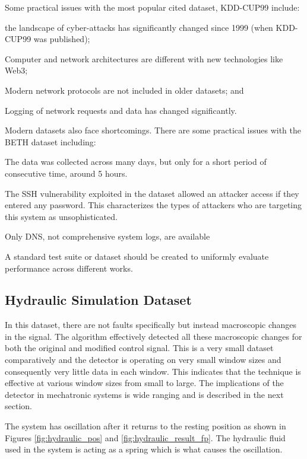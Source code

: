 Some practical issues with the most popular cited dataset, KDD-CUP99 include:
\begin{inlinelist}
    \item the landscape of cyber-attacks has significantly changed since 1999 (when KDD-CUP99 was published);
    \item Computer and network architectures are different with new technologies like Web3;
    \item Modern network protocols are not included in older datasets; and
    \item Logging of network requests and data has changed significantly.
\end{inlinelist}

Modern datasets also face shortcomings. There are some practical issues with the BETH dataset including:
\begin{inlinelist}
    \item The data was collected across many days, but only for a short period of consecutive time, around 5 hours.
    \item The SSH vulnerability exploited in the dataset allowed an attacker access if they entered any password. This characterizes the types of attackers who are targeting this system as unsophisticated.
    \item Only DNS, not comprehensive system logs, are available
\end{inlinelist}
A standard test suite or dataset should be created to uniformly evaluate performance across different works.

\subsection{Hydraulic Simulation Dataset}

In this dataset, there are not faults specifically but instead macroscopic changes in the signal. The algorithm effectively detected all these macroscopic changes for both the original and modified control signal. This is a very small dataset comparatively and the detector is operating on very small window sizes and consequently very little data in each window. This indicates that the technique is effective at various window sizes from small to large. The implications of the detector in mechatronic systems is wide ranging and is described in the next section.

The system has oscillation after it returns to the resting position as shown in Figures \ref{fig:hydraulic_pos} and \ref{fig:hydraulic_result_fp}. The hydraulic fluid used in the system is acting as a spring which is what causes the oscillation. 

